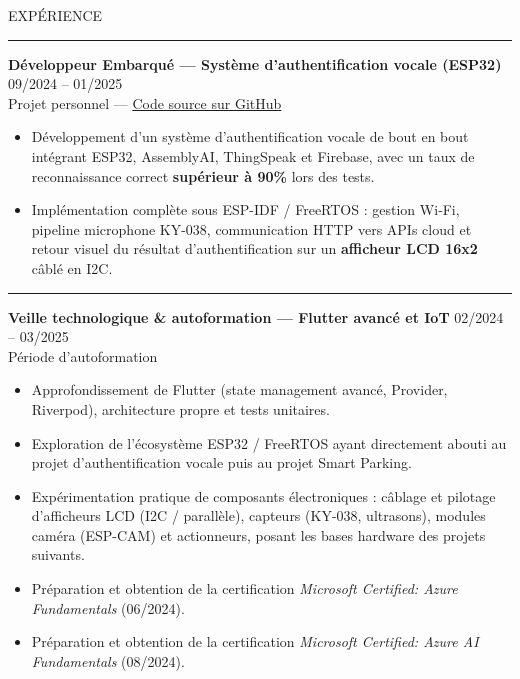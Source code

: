 \documentclass{resume}
\begin{document}
\begin{rSection}{EXPÉRIENCE}
\vspace{0.05cm}
\noindent\rule{\textwidth}{0.2pt}
\vspace{0.05cm}

{\bf Développeur Embarqué — Système d'authentification vocale (ESP32)} \hfill {09/2024 -- 01/2025}\\
Projet personnel — \href{https://github.com/hxhamdi/speech-auth}{Code source sur GitHub}
\begin{itemize}
    \item Développement d'un système d'authentification vocale de bout en bout intégrant ESP32,
          AssemblyAI, ThingSpeak et Firebase, avec un taux de reconnaissance correct
          \textbf{supérieur à 90\%} lors des tests.
    \item Implémentation complète sous ESP-IDF / FreeRTOS : gestion Wi‑Fi, pipeline microphone
          KY-038, communication HTTP vers APIs cloud et retour visuel du résultat d'authentification
          sur un \textbf{afficheur LCD 16x2} câblé en I2C.
\end{itemize}

\vspace{0.05cm}
\noindent\rule{\textwidth}{0.2pt}
\vspace{0.05cm}

{\bf Veille technologique \& autoformation — Flutter avancé et IoT} \hfill {02/2024 -- 03/2025}\\
Période d'autoformation
\begin{itemize}
    \item Approfondissement de Flutter (state management avancé, Provider, Riverpod),
          architecture propre et tests unitaires.
    \item Exploration de l'écosystème ESP32 / FreeRTOS ayant directement abouti au projet
          d'authentification vocale puis au projet Smart Parking.
    \item Expérimentation pratique de composants électroniques : câblage et pilotage d'afficheurs
          LCD (I2C / parallèle), capteurs (KY-038, ultrasons), modules caméra (ESP-CAM) et
          actionneurs, posant les bases hardware des projets suivants.
    \item Préparation et obtention de la certification \textit{Microsoft Certified: Azure Fundamentals}
          (06/2024).
    \item Préparation et obtention de la certification \textit{Microsoft Certified: Azure AI Fundamentals}
          (08/2024).
\end{itemize}


\end{rSection}
\end{document}
